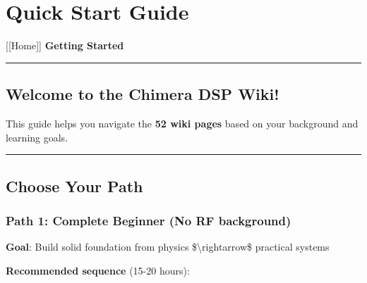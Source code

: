 \section{Quick Start Guide}\label{quick-start-guide}

{[}{[}Home{]}{]} \textbar{} \textbf{Getting Started}

\begin{center}\rule{0.5\linewidth}{0.5pt}\end{center}

\subsection{Welcome to the Chimera DSP
Wiki!}\label{welcome-to-the-chimera-dsp-wiki}

This guide helps you navigate the \textbf{52 wiki pages} based on your
background and learning goals.

\begin{center}\rule{0.5\linewidth}{0.5pt}\end{center}

\subsection{\texorpdfstring{ Choose Your
Path}{ Choose Your Path}}\label{choose-your-path}

\subsubsection{\texorpdfstring{Path 1: \textbf{Complete Beginner} (No RF
background)}{Path 1: Complete Beginner (No RF background)}}\label{path-1-complete-beginner-no-rf-background}

\textbf{Goal}: Build solid foundation from physics
\$\textbackslash rightarrow\$ practical systems

\textbf{Recommended sequence} (15-20 hours):


